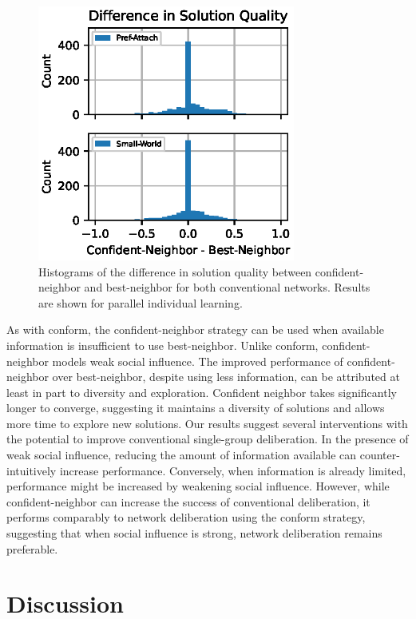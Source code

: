 \begin{figure}
    \centering
    \includegraphics[width=3.33in]{chapters/figures/NetDelibABM/fig-results-confident.eps}
	\caption{Histograms of the difference in solution quality between confident-neighbor and best-neighbor for both conventional networks.
	Results are shown for parallel individual learning.}
    \label{fig:results-confident}
\end{figure}

As with conform, the confident-neighbor strategy can be used when available information is insufficient to use best-neighbor. Unlike conform, confident-neighbor models weak social influence. The improved performance of confident-neighbor over best-neighbor, despite using less information, can be attributed at least in part to diversity and exploration. Confident neighbor takes significantly longer to converge, suggesting it maintains a diversity of solutions and allows more time to explore new solutions. Our results suggest several interventions with the potential to improve conventional single-group deliberation. In the presence of weak social influence, reducing the amount of information available can counter-intuitively increase performance. Conversely, when information is already limited, performance might be increased by weakening social influence. However, while confident-neighbor can increase the success of conventional deliberation, it performs comparably to network deliberation using the conform strategy, suggesting that when social influence is strong, network deliberation remains preferable.

\section{Discussion}

